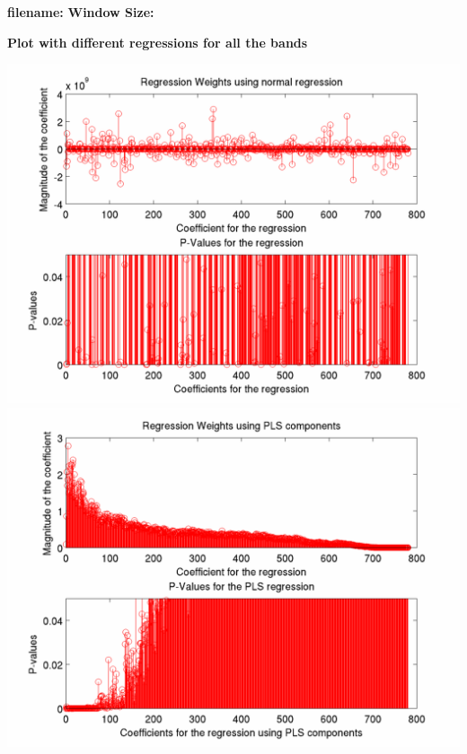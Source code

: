 \documentclass[12pt]{article}
\begin{document}
\newpage
\begin{center}
\textbf{filename: \expandafter\detokenize\expandafter{\myvar}}
\textbf{Window Size: \expandafter\detokenize\expandafter{\window}}


\textbf{Plot with different regressions for all the bands }
\end{center}
\includegraphics[scale=0.2]{full_regression_weights_p_value.png}
\includegraphics[scale=0.2]{full_glmfit_regression_pls.png}
\end{document}
